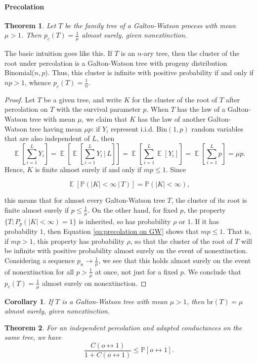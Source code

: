 \documentclass{article}
\newtheorem{Thm}{Theorem}[section]
\newtheorem{Cor}{Corollary}[Thm]
\theoremstyle{definition}
\newcommand{\EE}{\operatorname{\mathbb{E}}}
\newcommand{\PP}{\mathbb{P}}
\renewcommand{\leq}{\leqslant}
\newcommand{\<}{\left\langle}
\renewcommand{\>}{\right\rangle}
\begin{document}
\paragraph{Precolation}
\begin{Thm}
    Let \(T\) be the family tree of a Galton-Watson process with mean \(\mu > 1\). Then \(p_c(T) = \frac{1}{\mu}\) almost surely, given nonextinction.
\end{Thm}
The basic intuition goes like this.
If \(T\) is an \(n\)-ary tree, then the cluster of the root under percolation is a Galton-Watson tree with progeny distribution Binomial(\(n, p\)). Thus, this cluster is infinite with positive probability if and only if \(np > 1\), whence \(p_c(T) = \frac{1}{n}\).
\begin{proof}
    Let \(T\) be a given tree, and write \(K\) for the cluster of the root of \(T\) after percolation on \(T\) with the survival parameter \(p\). 
    When \(T\) has the law of a Galton-Watson tree with mean \(\mu\), we claim that \(K\) has the law of another Galton-Watson tree having mean \(\mu p\): 
    if \(Y_i\) represent i.i.d. \(\text{Bin}(1, p)\) random variables that are also independent of \(L\), then
\[
\EE\left[\sum_{i=1}^{L} Y_i\right] = \EE\left[\EE\left[\sum_{i=1}^{L} Y_i \,|\, L\right]\right] = \EE\left[\sum_{i=1}^{L} \EE[Y_i]\right] = \EE\left[\sum_{i=1}^{L} p\right] = \mu p.
\]
Hence, \(K\) is finite almost surely if and only if \(mp \leq 1\). Since

\begin{equation}\label{eq:precolation on GW}
    \EE[\PP(|K| < \infty \,|\, T)] = \PP(|K| < \infty),
\end{equation}
    
this means that for almost every Galton-Watson tree \(T\), the cluster of its root is finite almost surely if \(p \leq \frac{1}{\mu}\). 
On the other hand, for fixed \(p\), the property \(\{T; P_p(|K| < \infty) = 1\}\) is inherited, so has probability \(\rho\) or \(1\). 
If it has probability \(1\), then Equation \eqref{eq:precolation on GW} shows that \(mp \leq 1\). 
That is, if \(mp > 1\), this property has probability \(\rho\), so that the cluster of the root of \(T\) will be infinite with positive probability almost surely on the event of nonextinction. 
Considering a sequence \(p_n \to \frac{1}{\mu}\), we see that this holds almost surely on the event of nonextinction for all \(p > \frac{1}{\mu}\) at once, not just for a fixed \(p\). 
We conclude that \(p_c(T) = \frac{1}{\mu}\) almost surely on nonextinction.

\end{proof}
\begin{Cor}
    If \(T\) is a Galton-Watson tree with mean \(\mu > 1\), then \(\text{br}(T) = \mu\) almost surely, given nonextinction.
\end{Cor}
\begin{Thm}
    For an independent percolation and adapted conductances on the same tree, we have
\[
\frac{C(o \leftrightarrow 1)}{1 + C(o \leftrightarrow 1)} \leq \PP[o \leftrightarrow 1].
\]

\end{Thm}
\end{document}
